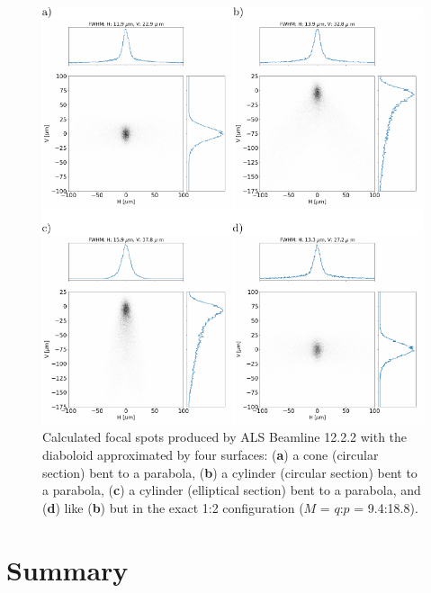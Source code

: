 \documentclass{iucr}       %
\begin{document}
\begin{figure}\label{fig:finalcomparison}
\includegraphics[width=1.0\textwidth]{figures/fig9.pdf}
% 


\caption{Calculated focal spots produced by ALS Beamline 12.2.2 with the diaboloid approximated by four surfaces: (\textbf{a}) a cone (circular section) bent to a parabola, (\textbf{b}) a cylinder (circular section) bent to a parabola, (\textbf{c}) a cylinder (elliptical section) bent to a parabola, and (\textbf{d}) like (\textbf{b}) but in the exact 1:2 configuration ($M$ = $q$:$p$ = 9.4:18.8).}
\end{figure}

\section{Summary}
\label{sec:summary}
\end{document}
